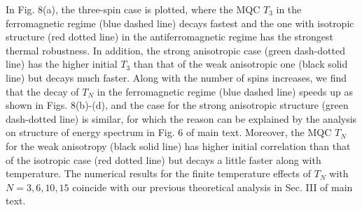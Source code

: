 \documentclass[pra,aps,twocolumn,showpacs]{revtex4}
\begin{document}
In Fig. 8(a), the three-spin case is plotted, where the MQC $T_3$ in the ferromagnetic regime (blue dashed line) decays fastest and the one with isotropic structure (red dotted line) in the antiferromagnetic regime has the strongest thermal robustness. In addition, the strong anisotropic case (green dash-dotted line) has the higher initial $T_3$ than that of the weak anisotropic one (black solid line) but decays much faster. Along with the number of spins increases, we find that the decay of $T_N$ in the ferromagnetic regime (blue dashed line) speeds up as shown in Figs. 8(b)-(d), and the case for the strong anisotropic structure (green dash-dotted line) is similar, for which the reason can be explained by the analysis on structure of energy spectrum in Fig. 6 of main text. Moreover, the MQC $T_N$ for the weak anisotropy (black solid line) has higher initial correlation than that of the isotropic case (red dotted line) but decays a little faster along with temperature. The numerical results for the finite temperature effects of $T_N$ with $N=3,6,10,15$ coincide with our previous theoretical analysis in Sec. III of main text.
\end{document}
